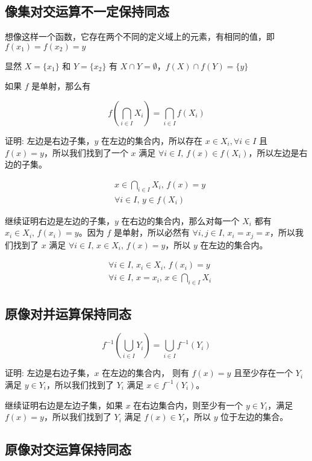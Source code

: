 \subsection{像集对交运算不一定保持同态}

想像这样一个函数，它存在两个不同的定义域上的元素，有相同的值，即 $f(x_1) = f(x_2) = y$

显然 $X = \{ x_1 \}$ 和 $Y = \{ x_2 \}$ 有 $X \cap Y = \emptyset$，$f(X) \cap f(Y) = \{ y \} $

如果 $f$ 是单射，那么有 

\[
f(\bigcap_{i \in I}X_i) = \bigcap_{i \in I}f(X_i)
\]

证明: 左边是右边子集，$y$ 在左边的集合内，所以存在 $x \in X_i, \forall i \in I$ 且 $f(x) = y$，所以我们找到了一个 $x$ 满足 $\forall i \in I,\, f(x) \in f(X_i)$，所以左边是右边的子集。

\begin{align*}
    & x \in \bigcap_{i \in I}X_i,\, f(x) = y \\
    & \forall i \in I,\, y \in f(X_i)
\end{align*}

继续证明右边是左边的子集，$y$ 在右边的集合内，那么对每一个 $X_i$ 都有 $x_i \in X_i,\, f(x_i) = y$。因为 $f$ 是单射，所以必然有 $\forall i,j \in I,\, x_i = x_j = x$，所以我们找到了
$x$ 满足 $\forall i \in I,\, x \in X_i,\, f(x) = y$，所以 $y$ 在左边的集合内。


\begin{align*}
    & \forall i \in I,\, x_i \in X_i,\, f(x_i) = y \\
    & \forall i \in I,\, x = x_i,\, x \in \bigcap_{i \in I}X_i
\end{align*}

\subsection{原像对并运算保持同态}

\[
f^{-1}(\bigcup_{i \in I} Y_i) = \bigcup_{i \in I} f^{-1}(Y_i)
\]


证明: 左边是右边子集，$x$ 在左边的集合内， 则有 $f(x) = y$ 且至少存在一个 $Y_i$ 满足 $y \in Y_i$，所以我们找到了 $Y_i$ 满足 $x \in f^{-1}(Y_i)$。

继续证明右边是左边子集，如果 $x$ 在右边集合内，则至少有一个 $y \in Y_i$，满足 $f(x) = y$，所以我们找到了 $Y_i$ 满足 $f(x) \in Y_i$，所以 
$y$ 位于左边的集合。


\subsection{原像对交运算保持同态}


